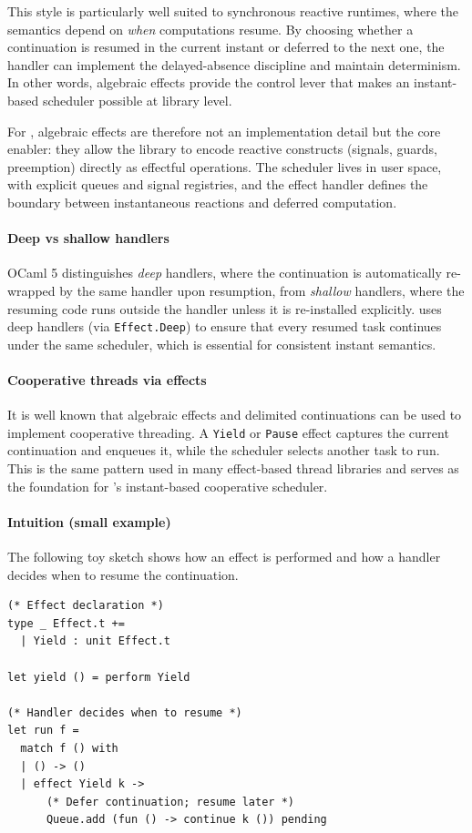 This style is particularly well suited to synchronous reactive runtimes, where
the semantics depend on \emph{when} computations resume. By choosing whether a
continuation is resumed in the current instant or deferred to the next one, the
handler can implement the delayed-absence discipline and maintain determinism.
In other words, algebraic effects provide the control lever that makes an
instant-based scheduler possible at library level.

For \tempo{}, algebraic effects are therefore not an implementation detail but the
core enabler: they allow the library to encode reactive constructs (signals,
guards, preemption) directly as effectful operations. The scheduler lives in
user space, with explicit queues and signal registries, and the effect handler
defines the boundary between instantaneous reactions and deferred computation.

\paragraph{Deep vs shallow handlers}
OCaml 5 distinguishes \emph{deep} handlers, where the continuation is
automatically re-wrapped by the same handler upon resumption, from
\emph{shallow} handlers, where the resuming code runs outside the handler
unless it is re-installed explicitly. \tempo{} uses deep handlers (via
\texttt{Effect.Deep}) to ensure that every resumed task continues under the
same scheduler, which is essential for consistent instant semantics.

\paragraph{Cooperative threads via effects}
It is well known that algebraic effects and delimited continuations can be
used to implement cooperative threading. A \texttt{Yield} or \texttt{Pause}
effect captures the current continuation and enqueues it, while the scheduler
selects another task to run. This is the same pattern used in many effect-based
thread libraries and serves as the foundation for \tempo{}'s instant-based
cooperative scheduler.

\paragraph{Intuition (small example)}
The following toy sketch shows how an effect is performed and how a handler
decides when to resume the continuation.
\begin{lstlisting}[style=tempo]
(* Effect declaration *)
type _ Effect.t +=
  | Yield : unit Effect.t

let yield () = perform Yield

(* Handler decides when to resume *)
let run f =
  match f () with
  | () -> ()
  | effect Yield k ->
      (* Defer continuation; resume later *)
      Queue.add (fun () -> continue k ()) pending
\end{lstlisting}

